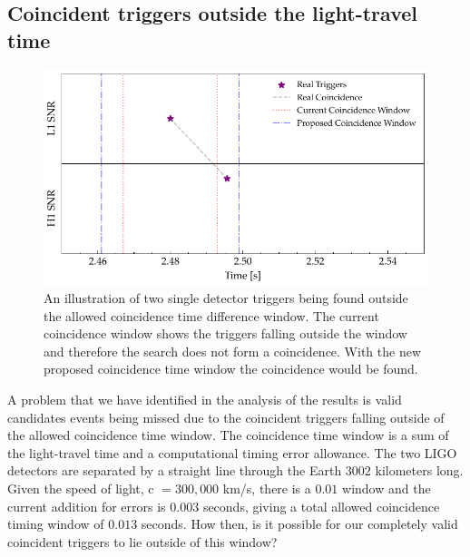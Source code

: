 



\subsection{\label{6:sec:outside-coinc-window}Coincident triggers outside the light-travel time}
%
\begin{figure}
    \centering
    \includegraphics[width=\textwidth]{images/6_earlywarning/identified-problems/outside_coinc_window.pdf}
    \caption{An illustration of two single detector triggers being found outside the allowed coincidence time difference window. The current coincidence window shows the triggers falling outside the window and therefore the search does not form a coincidence. With the new proposed coincidence time window the coincidence would be found.}
    \label{6:fig:outside_coinc_window}
\end{figure}
%

A problem that we have identified in the analysis of the results is valid candidates events being missed due to the coincident triggers falling outside of the allowed coincidence time window. The coincidence time window is a sum of the light-travel time and a computational timing error allowance. The two LIGO detectors are separated by a straight line through the Earth $3002$ kilometers long. Given the speed of light, c $= 300,000$ km/s, there is a $0.01$ window and the current addition for errors is $0.003$ seconds, giving a total allowed coincidence timing window of $0.013$ seconds. How then, is it possible for our completely valid coincident triggers to lie outside of this window?

